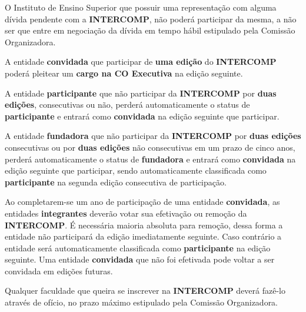 \begin{article}
	\begin{xparagraph}
		O Instituto de Ensino Superior que possuir uma representação com alguma dívida pendente com a \textbf{INTERCOMP}, não poderá participar da mesma, a não ser que entre em negociação da dívida em tempo hábil estipulado pela Comissão Organizadora.
	\end{xparagraph}

	\begin{xparagraph}
		A entidade \textbf{convidada} que participar de \textbf{uma edição} do \textbf{INTERCOMP} poderá pleitear um \textbf{cargo na CO Executiva} na edição seguinte.
	\end{xparagraph}

	\begin{xparagraph}
		A entidade \textbf{participante} que não participar da \textbf{INTERCOMP} por \textbf{duas edições}, consecutivas ou não, perderá automaticamente o status de \textbf{participante} e entrará como \textbf{convidada} na edição seguinte que participar.
	\end{xparagraph}

	\begin{xparagraph}
		A entidade \textbf{fundadora} que não participar da \textbf{INTERCOMP} por \textbf{duas edições} consecutivas ou por \textbf{duas edições} não consecutivas em um prazo de cinco anos, perderá automaticamente o status de \textbf{fundadora} e entrará como \textbf{convidada} na edição seguinte que participar, sendo automaticamente classificada como \textbf{participante} na segunda edição consecutiva de participação.
	\end{xparagraph}
\end{article}

\begin{article}
	Ao completarem-se um ano de participação de uma entidade \textbf{convidada}, as entidades \textbf{integrantes} deverão votar sua efetivação ou remoção da \textbf{INTERCOMP}. É necessária maioria absoluta para remoção, dessa forma a entidade não participará da edição imediatamente seguinte. Caso contrário a entidade será automaticamente classificada como \textbf{participante} na edição seguinte. Uma entidade \textbf{convidada} que não foi efetivada pode voltar a ser convidada em edições futuras.
\end{article}

\begin{article}
	Qualquer faculdade que queira se inscrever na \textbf{INTERCOMP} deverá fazê-lo através de ofício, no prazo máximo estipulado pela Comissão Organizadora.
\end{article}

